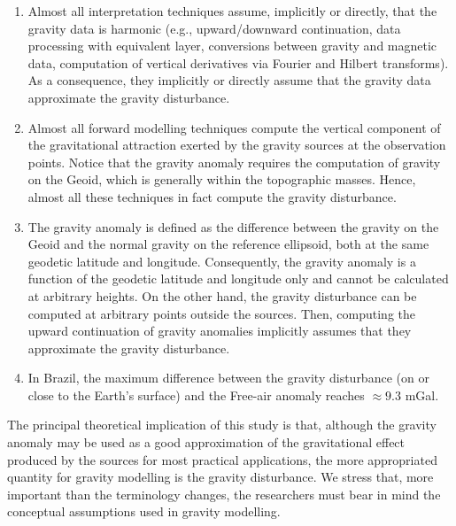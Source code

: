 \documentclass[extra]{gji}
\begin{document}
\begin{enumerate}
\renewcommand{\theenumii}{\alph{enumii}}

\item Almost all interpretation techniques assume, implicitly or
directly, that the gravity data is harmonic (e.g., 
upward/downward continuation, 
data processing with equivalent layer,
conversions between gravity and magnetic data,
computation of vertical derivatives via Fourier and Hilbert
transforms). As a consequence, they implicitly or directly assume that
the gravity data approximate the gravity disturbance.

\item Almost all forward modelling techniques compute
the vertical component of the gravitational attraction 
exerted by the gravity sources at the observation points.
Notice that the gravity anomaly requires the computation of gravity
on the Geoid, which is generally within the topographic masses.
Hence, almost all these techniques in fact compute the gravity 
disturbance.

\item The gravity anomaly is defined as the difference between 
the gravity on the Geoid and the normal gravity on the reference 
ellipsoid, both at the same geodetic latitude and longitude.
Consequently, the gravity anomaly is a function of
the geodetic latitude and longitude only and cannot
be calculated at arbitrary heights. On the other hand,
the gravity disturbance can be computed at arbitrary points
outside the sources. Then, computing the upward 
continuation of gravity anomalies implicitly assumes 
that they approximate the gravity disturbance.

\item In Brazil, the maximum difference between the gravity 
disturbance (on or close to the Earth's surface) and the Free-air
anomaly reaches $\approx 9.3$ mGal.

\end{enumerate}

The principal theoretical implication of this study is that,
although the gravity anomaly may be used as a good approximation of
the gravitational effect produced by the sources for most practical applications,
the more appropriated quantity for gravity modelling is the
gravity disturbance. We stress that, more important than the 
terminology changes, the researchers must bear in mind the 
conceptual assumptions used in gravity modelling.
\end{document}
